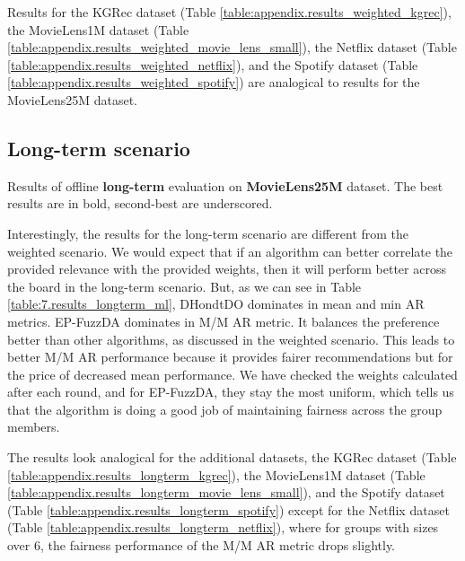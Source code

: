 Results for the KGRec dataset (Table \ref{table:appendix.results_weighted_kgrec}), 
the MovieLens1M dataset (Table \ref{table:appendix.results_weighted_movie_lens_small}), 
the Netflix dataset (Table \ref{table:appendix.results_weighted_netflix}), 
and the Spotify dataset (Table \ref{table:appendix.results_weighted_spotify})
are analogical to results for the MovieLens25M dataset.

\subsection{Long-term scenario}

\begin{table}[!ht]
    \centering
    \scalebox{0.82}{\hspace*{-1.2cm}{
        
    }}\hspace*{-1.3cm}
    \caption[Results of offline long-term evaluation on Netflix dataset]{Results of offline \textbf{long-term} evaluation on \textbf{MovieLens25M} dataset. The best results are in bold, second-best are underscored.}
    \label{table:7.results_longterm_ml}
\end{table}

Interestingly, the results for the long-term scenario are different from the weighted scenario. We would expect that if an algorithm can better correlate the provided relevance with the provided weights, then it will perform better across the board in the long-term scenario. But, as we can see in Table \ref{table:7.results_longterm_ml}, DHondtDO dominates in mean and min AR metrics. EP-FuzzDA dominates in M/M AR metric. It balances the preference better than other algorithms, as discussed in the weighted scenario. This leads to better M/M AR performance because it provides fairer recommendations but for the price of decreased mean performance. We have checked the weights calculated after each round, and for EP-FuzzDA, they stay the most uniform, which tells us that the algorithm is doing a good job of maintaining fairness across the group members.

The results look analogical for the additional datasets, the KGRec dataset (Table \ref{table:appendix.results_longterm_kgrec}), 
the MovieLens1M dataset (Table \ref{table:appendix.results_longterm_movie_lens_small}), 
and the Spotify dataset (Table \ref{table:appendix.results_longterm_spotify}) 
except for the Netflix dataset (Table \ref{table:appendix.results_longterm_netflix}), where for groups with sizes over 6, the fairness performance of the M/M AR metric drops slightly.

